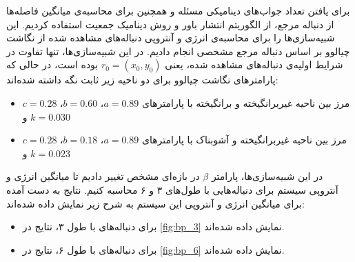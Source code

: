 برای یافتن تعداد جواب‌های دینامیکی مسئله و همچنین برای محاسبه‌ی میانگین فاصله‌ها از دنباله مرجع، از الگوریتم انتشار باور و روش دینامیک جمعیت استفاده کردیم.
این شبیه‌سازی‌ها را برای محاسبه‌ی انرژی و آنتروپی دنباله‌های مشاهده شده از نگاشت چیالوو بر اساس دنباله مرجع مشخصی انجام دادیم.
در این شبیه‌سازی‌ها، تنها تفاوت در شرایط اولیه‌ی دنباله‌های مشاهده شده، یعنی
\( r_{0} = (x_{0}, y_{0}) \)
بوده است، در حالی که پارامترهای نگاشت چیالوو برای دو ناحیه زیر ثابت نگه داشته شده‌اند:
\begin{itemize}[label=-]
    \item مرز بین ناحیه غیربرانگیخته و برانگیخته با پارامتر‌های
          \( a = 0.89 \)، \( b = 0.60 \)، \( c = 0.28 \) و \( k = 0.030 \)
    \item مرز بین ناحیه غیربرانگیخته و آشوبناک با پارامترهای
          \( a = 0.89 \)، \( b = 0.18 \)، \( c = 0.28 \) و \( k = 0.023 \)
\end{itemize}
در این شبیه‌سازی‌ها، پارامتر
\( \beta \)
در بازه‌ای مشخص تغییر دادیم تا میانگین انرژی و آنتروپی سیستم برای دنباله‌هایی با طول‌های ۳ و ۶ محاسبه کنیم.
نتایج به دست آمده برای میانگین انرژی و آنتروپی این سیستم به شرح زیر نمایش داده شده‌اند:
\begin{itemize}[label=-]
    \item برای دنباله‌های با طول ۳، نتایج در
          \autoref{fig:bp_3}
          نمایش داده شده‌اند.
    \item برای دنباله‌های با طول ۶، نتایج در
          \autoref{fig:bp_6}
          نمایش داده شده‌اند.
\end{itemize}


